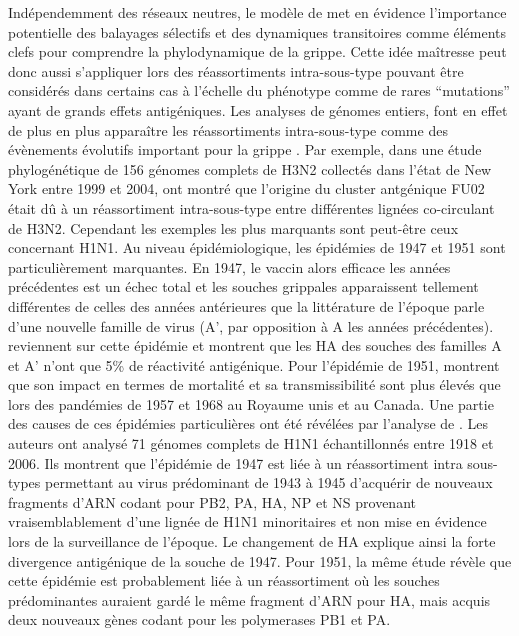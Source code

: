 Indépendemment des réseaux neutres, le modèle de \citet{Koelle2006}
met en évidence l'importance potentielle des balayages sélectifs et
des dynamiques transitoires comme éléments clefs pour comprendre la
phylodynamique de la grippe. Cette idée maîtresse peut donc aussi
s'appliquer lors des réassortiments intra-sous-type pouvant être
considérés dans certains cas à l'échelle du phénotype comme de rares
``mutations'' ayant de grands effets antigéniques. Les analyses de
génomes entiers, font en effet de plus en plus apparaître les
réassortiments intra-sous-type comme des évènements évolutifs
important pour la grippe \citep{Holmes2005, Nelson2007}. Par exemple,
dans une étude phylogénétique de 156 génomes complets de H3N2
collectés dans l'état de New York entre 1999 et 2004,
\citet{Holmes2005} ont montré que l'origine du cluster antgénique FU02
était dû à un réassortiment intra-sous-type entre différentes lignées
co-circulant de H3N2.  Cependant les exemples les plus marquants sont
peut-être ceux concernant H1N1. Au niveau épidémiologique, les
épidémies de 1947 et 1951 sont particulièrement marquantes. En 1947,
le vaccin alors efficace les années précédentes est un échec total et
les souches grippales apparaissent tellement différentes de celles des
années antérieures que la littérature de l'époque parle d'une nouvelle
famille de virus (A', par opposition à A les années précédentes).
\citet{Kilbourne2002} reviennent sur cette épidémie et montrent que
les HA des souches des familles A et A' n'ont que 5\% de réactivité
antigénique. Pour l'épidémie de 1951, \citet{Viboud2006b} montrent que
son impact en termes de mortalité et sa transmissibilité sont plus
élevés que lors des pandémies de 1957 et 1968 au Royaume unis et au
Canada. Une partie des causes de ces épidémies particulières ont été
révélées par l'analyse de \citet{Nelson2008}. Les auteurs ont analysé
71 génomes complets de H1N1 échantillonnés entre 1918 et 2006. Ils
montrent que l'épidémie de 1947 est liée à un réassortiment intra
sous-types permettant au virus prédominant de 1943 à 1945 d'acquérir
de nouveaux fragments d'ARN codant pour PB2, PA, HA, NP et NS
provenant vraisemblablement d'une lignée de H1N1 minoritaires et non
mise en évidence lors de la surveillance de l'époque. Le changement de
HA explique ainsi la forte divergence antigénique de la souche de
1947. Pour 1951, la même étude révèle que cette épidémie est
probablement liée à un réassortiment où les souches prédominantes
auraient gardé le même fragment d'ARN pour HA, mais acquis deux
nouveaux gènes codant pour les polymerases PB1 et PA.

